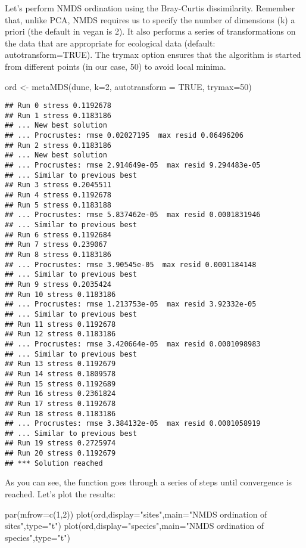 \documentclass[
]{book}
\newenvironment{Shaded}{\begin{snugshade}}{\end{snugshade}}
\newcommand{\AttributeTok}[1]{\textcolor[rgb]{0.77,0.63,0.00}{#1}}
\newcommand{\ConstantTok}[1]{\textcolor[rgb]{0.00,0.00,0.00}{#1}}
\newcommand{\DecValTok}[1]{\textcolor[rgb]{0.00,0.00,0.81}{#1}}
\newcommand{\FunctionTok}[1]{\textcolor[rgb]{0.00,0.00,0.00}{#1}}
\newcommand{\NormalTok}[1]{#1}
\newcommand{\OtherTok}[1]{\textcolor[rgb]{0.56,0.35,0.01}{#1}}
\newcommand{\StringTok}[1]{\textcolor[rgb]{0.31,0.60,0.02}{#1}}
\begin{document}
Let's perform NMDS ordination using the Bray-Curtis dissimilarity. Remember that, unlike PCA, NMDS requires us to specify the number of dimensions (k) a priori (the default in vegan is 2). It also performs a series of transformations on the data that are appropriate for ecological data (default: autotransform=TRUE). The trymax option ensures that the algorithm is started from different points (in our case, 50) to avoid local minima.

\begin{Shaded}
\begin{Highlighting}[]
\NormalTok{ord }\OtherTok{\textless{}{-}} \FunctionTok{metaMDS}\NormalTok{(dune, }\AttributeTok{k=}\DecValTok{2}\NormalTok{, }\AttributeTok{autotransform =} \ConstantTok{TRUE}\NormalTok{, }\AttributeTok{trymax=}\DecValTok{50}\NormalTok{)}
\end{Highlighting}
\end{Shaded}

\begin{verbatim}
## Run 0 stress 0.1192678 
## Run 1 stress 0.1183186 
## ... New best solution
## ... Procrustes: rmse 0.02027195  max resid 0.06496206 
## Run 2 stress 0.1183186 
## ... New best solution
## ... Procrustes: rmse 2.914649e-05  max resid 9.294483e-05 
## ... Similar to previous best
## Run 3 stress 0.2045511 
## Run 4 stress 0.1192678 
## Run 5 stress 0.1183188 
## ... Procrustes: rmse 5.837462e-05  max resid 0.0001831946 
## ... Similar to previous best
## Run 6 stress 0.1192684 
## Run 7 stress 0.239067 
## Run 8 stress 0.1183186 
## ... Procrustes: rmse 3.90545e-05  max resid 0.0001184148 
## ... Similar to previous best
## Run 9 stress 0.2035424 
## Run 10 stress 0.1183186 
## ... Procrustes: rmse 1.213753e-05  max resid 3.92332e-05 
## ... Similar to previous best
## Run 11 stress 0.1192678 
## Run 12 stress 0.1183186 
## ... Procrustes: rmse 3.420664e-05  max resid 0.0001098983 
## ... Similar to previous best
## Run 13 stress 0.1192679 
## Run 14 stress 0.1809578 
## Run 15 stress 0.1192689 
## Run 16 stress 0.2361824 
## Run 17 stress 0.1192678 
## Run 18 stress 0.1183186 
## ... Procrustes: rmse 3.384132e-05  max resid 0.0001058919 
## ... Similar to previous best
## Run 19 stress 0.2725974 
## Run 20 stress 0.1192679 
## *** Solution reached
\end{verbatim}

As you can see, the function goes through a series of steps until convergence is reached. Let's plot the results:

\begin{Shaded}
\begin{Highlighting}[]
\FunctionTok{par}\NormalTok{(}\AttributeTok{mfrow=}\FunctionTok{c}\NormalTok{(}\DecValTok{1}\NormalTok{,}\DecValTok{2}\NormalTok{))}
\FunctionTok{plot}\NormalTok{(ord,}\AttributeTok{display=}\StringTok{"sites"}\NormalTok{,}\AttributeTok{main=}\StringTok{"NMDS ordination of sites"}\NormalTok{,}\AttributeTok{type=}\StringTok{"t"}\NormalTok{)}
\FunctionTok{plot}\NormalTok{(ord,}\AttributeTok{display=}\StringTok{"species"}\NormalTok{,}\AttributeTok{main=}\StringTok{"NMDS ordination of species"}\NormalTok{,}\AttributeTok{type=}\StringTok{"t"}\NormalTok{)}
\end{Highlighting}
\end{Shaded}
\end{document}
